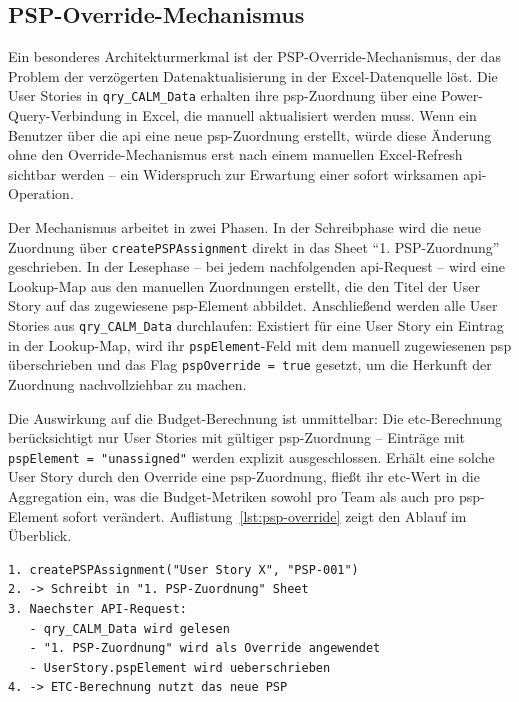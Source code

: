 \subsection{PSP-Override-Mechanismus}

Ein besonderes Architekturmerkmal ist der PSP-Override-Mechanismus, der das Problem der verzögerten Datenaktualisierung in der Excel-Datenquelle löst. Die User Stories in \texttt{qry\_CALM\_Data} erhalten ihre \gls{psp}-Zuordnung über eine Power-Query-Verbindung in Excel, die manuell aktualisiert werden muss. Wenn ein Benutzer über die \gls{api} eine neue \gls{psp}-Zuordnung erstellt, würde diese Änderung ohne den Override-Mechanismus erst nach einem manuellen Excel-Refresh sichtbar werden -- ein Widerspruch zur Erwartung einer sofort wirksamen \gls{api}-Operation.

Der Mechanismus arbeitet in zwei Phasen. In der Schreibphase wird die neue Zuordnung über \texttt{createPSPAssignment} direkt in das Sheet \enquote{1. PSP-Zuordnung} geschrieben. In der Lesephase -- bei jedem nachfolgenden \gls{api}-Request -- wird eine Lookup-Map aus den manuellen Zuordnungen erstellt, die den Titel der User Story auf das zugewiesene \gls{psp}-Element abbildet. Anschließend werden alle User Stories aus \texttt{qry\_CALM\_Data} durchlaufen: Existiert für eine User Story ein Eintrag in der Lookup-Map, wird ihr \texttt{pspElement}-Feld mit dem manuell zugewiesenen \gls{psp} überschrieben und das Flag \texttt{pspOverride = true} gesetzt, um die Herkunft der Zuordnung nachvollziehbar zu machen.

Die Auswirkung auf die Budget-Berechnung ist unmittelbar: Die \gls{etc}-Berechnung berücksichtigt nur User Stories mit gültiger \gls{psp}-Zuordnung -- Einträge mit \texttt{pspElement = "unassigned"} werden explizit ausgeschlossen. Erhält eine solche User Story durch den Override eine \gls{psp}-Zuordnung, fließt ihr \gls{etc}-Wert in die Aggregation ein, was die Budget-Metriken sowohl pro Team als auch pro \gls{psp}-Element sofort verändert. Auflistung~\ref{lst:psp-override} zeigt den Ablauf im Überblick.

\begin{lstlisting}[caption={PSP-Override Ablauf}, label={lst:psp-override}]
1. createPSPAssignment("User Story X", "PSP-001")
2. -> Schreibt in "1. PSP-Zuordnung" Sheet
3. Naechster API-Request:
   - qry_CALM_Data wird gelesen
   - "1. PSP-Zuordnung" wird als Override angewendet
   - UserStory.pspElement wird ueberschrieben
4. -> ETC-Berechnung nutzt das neue PSP
\end{lstlisting}

